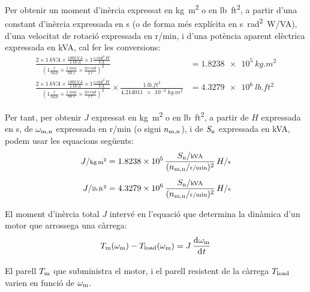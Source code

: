 Per  obtenir un moment d'inèrcia expressat en \unit{kg.m^2} o en \unit{lb.ft^2}, a partir d'una constant d'inèrcia  expressada en \unit{s} (o de forma més explícita en \unit{s.rad^2.W/VA}), d'una velocitat de rotació expressada en \unit{r/min}, i d'una potència aparent elèctrica expressada en \unit{kVA}, cal  fer les conversions:
\begin{subequations}
\begin{align}
    \frac{2\times \qty{1}{kVA} \times \frac{\qty{1000}{VA}}{\qty{1}{kVA}} \times 1 \frac{\unit{s.rad^2.W}}{\unit{VA}}}{\left(1\frac{\unit{r}}{\unit{min}} \times \frac{\qty{1}{min}}{\qty{60}{s}} \times \frac{2\pi\,\unit{rad}}{\qty{1}{r}}\right)^2}  &= \qty{1,8238e5}{kg.m^2} \\[1ex]
    \frac{2\times \qty{1}{kVA} \times \frac{\qty{1000}{VA}}{\qty{1}{kVA}} \times 1 \frac{\unit{s.rad^2.W}}{\unit{VA}}}{\left(1\frac{\unit{r}}{\unit{min}} \times \frac{\qty{1}{min}}{\qty{60}{s}} \times \frac{2\pi\,\unit{rad}}{\qty{1}{r}}\right)^2}  \times \frac{\qty{1}{lb.ft^2}}{\qty{4,214011e-2}{kg.m^2}} &= \qty{4,3279e6}{lb.ft^2}
\end{align}
\end{subequations}

Per tant, per  obtenir $J$  expressat en \unit{kg.m^2} o en \unit{lb.ft^2}, a partir de $H$ expressada en \unit{s}, de $\omega_\mathrm{m,n}$ expressada en \unit{r/min} (o sigui $n_\mathrm{m,n}$), i de $S_\mathrm{n}$ expressada en \unit{kVA}, podem usar les equacions següents:
\begin{subequations}
\begin{align}
     J/{\scriptstyle \unit{kg.m^2}} &= \num{1,8238e5}\,  \frac{S\ped{n}/{\scriptstyle \unit{kVA}}}{(n\ped{m,n}/{\scriptstyle \unit{r/min}})^2} \, H/{\scriptstyle \unit{s}}\\[1ex]
    J/{\scriptstyle \unit{lb.ft^2}} &= \num{4,3279e6}\,  \frac{S\ped{n}/{\scriptstyle \unit{kVA}}}{(n\ped{m,n}/{\scriptstyle \unit{r/min}})^2} \, H/{\scriptstyle \unit{s}}
\end{align}
\end{subequations}

El moment d'inèrcia total $J$ intervé en l'equació que  determina la dinàmica d'un motor que arrossega una càrrega:
\begin{equation}\label{eq:Tm-Tl-vel}
    T\ped{m}(\omega\ped{m}) - T\ped{load}(\omega\ped{m}) = J\,\frac{\diff \omega\ped{m}}{\diff t}
\end{equation}

El parell $T_\mathrm{m}$ que subministra el motor, i el parell resistent de la càrrega $T_\mathrm{load}$ varien en funció de $\omega_\mathrm{m}$.

